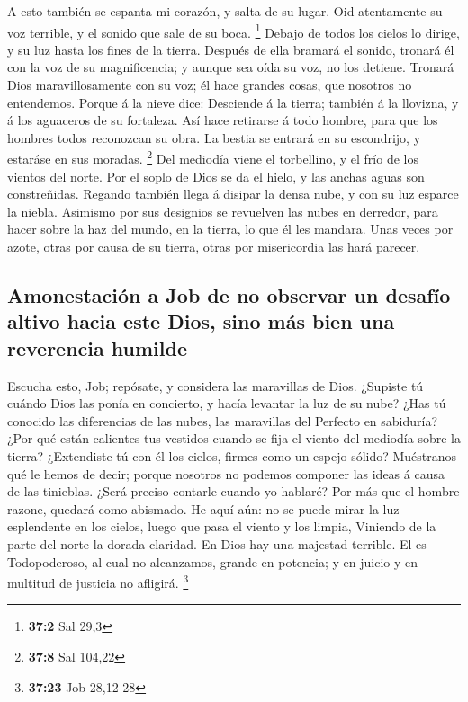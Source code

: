 A esto también se espanta mi corazón, y salta de su lugar.
 Oid atentamente su voz terrible, y el sonido que sale de su
boca. \footnote{\textbf{37:2} Sal 29,3}  Debajo de todos los
cielos lo dirige, y su luz hasta los fines de la tierra. 
Después de ella bramará el sonido, tronará él con la voz de su
magnificencia; y aunque sea oída su voz, no los detiene. 
Tronará Dios maravillosamente con su voz; él hace grandes cosas, que
nosotros no entendemos.  Porque á la nieve dice: Desciende á
la tierra; también á la llovizna, y á los aguaceros de su fortaleza.
 Así hace retirarse á todo hombre, para que los hombres
todos reconozcan su obra.  La bestia se entrará en su
escondrijo, y estaráse en sus moradas. \footnote{\textbf{37:8} Sal
  104,22}  Del mediodía viene el torbellino, y el frío de
los vientos del norte.  Por el soplo de Dios se da el
hielo, y las anchas aguas son constreñidas.  Regando
también llega á disipar la densa nube, y con su luz esparce la niebla.
 Asimismo por sus designios se revuelven las nubes en
derredor, para hacer sobre la haz del mundo, en la tierra, lo que él les
mandara.  Unas veces por azote, otras por causa de su
tierra, otras por misericordia las hará parecer.

\hypertarget{amonestaciuxf3n-a-job-de-no-observar-un-desafuxedo-altivo-hacia-este-dios-sino-muxe1s-bien-una-reverencia-humilde}{%
\subsection{Amonestación a Job de no observar un desafío altivo hacia
este Dios, sino más bien una reverencia
humilde}\label{amonestaciuxf3n-a-job-de-no-observar-un-desafuxedo-altivo-hacia-este-dios-sino-muxe1s-bien-una-reverencia-humilde}}

 Escucha esto, Job; repósate, y considera las maravillas de
Dios.  ¿Supiste tú cuándo Dios las ponía en concierto, y
hacía levantar la luz de su nube?  ¿Has tú conocido las
diferencias de las nubes, las maravillas del Perfecto en sabiduría?
 ¿Por qué están calientes tus vestidos cuando se fija el
viento del mediodía sobre la tierra?  ¿Extendiste tú con él
los cielos, firmes como un espejo sólido?  Muéstranos qué
le hemos de decir; porque nosotros no podemos componer las ideas á causa
de las tinieblas.  ¿Será preciso contarle cuando yo
hablaré? Por más que el hombre razone, quedará como abismado.
 He aquí aún: no se puede mirar la luz esplendente en los
cielos, luego que pasa el viento y los limpia,  Viniendo de
la parte del norte la dorada claridad. En Dios hay una majestad
terrible.  El es Todopoderoso, al cual no alcanzamos,
grande en potencia; y en juicio y en multitud de justicia no afligirá.
\footnote{\textbf{37:23} Job 28,12-28}

